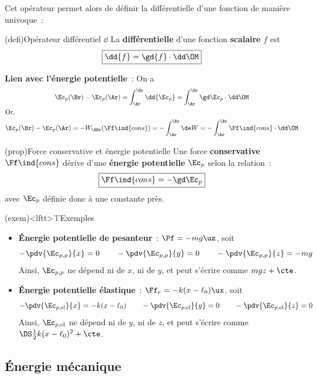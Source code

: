 \documentclass[../../main/main.tex]{subfiles}
\begin{document}
Cet opérateur permet alors de définir la différentielle d'une fonction de
manière univoque~:

\begin{tcb*}(defi){Opérateur différentiel $\dd$}
	La \textbf{différentielle} d'une fonction \textbf{scalaire} $f$ est
	\[\boxed{\dd{f} = \gd{f}\cdot\dd\OM}\]
\end{tcb*}

\textbf{Lien avec l'énergie potentielle}~: On a
\begin{gather*}
	\Ec_p(\Br) - \Ec_p(\Ar) = \int_{\Ar}^{\Br} \dd{\Ec_p} = \int_{\Ar}^{\Br}
	\gd\Ec_p\cdot\dd\OM
	\\
	\shortintertext{Or,}
	\Ec_p(\Br) - \Ec_p(\Ar) = -W_{\ABr}(\Ff\ind{cons}) = - \int_{\Ar}^{\Br} \de W = -
	\int_{\Ar}^{\Br} \Ff\ind{cons}\cdot\dd\OM
\end{gather*}

\begin{tcb*}(prop){Force conservative et énergie potentielle}
	Une force \textbf{conservative} $\Ff\ind{cons}$ dérive d'une \textbf{énergie
		potentielle} $\Ec_p$ selon la relation~:
	\[\boxed{\Ff\ind{cons} = -\gd\Ec_p}\]
	avec $\Ec_p$ définie donc à une constante près.
\end{tcb*}

\begin{tcb*}(exem)<lftt>'l'{Exemples}
	\begin{itemize}
		\item \textbf{Énergie potentielle de pesanteur}~: $\Pf = -mg\uz$, soit
		      \[
			      -\pdv{\Ec_{p,p}}{x} = 0
			      \qquad
			      -\pdv{\Ec_{p,p}}{y} = 0
			      \qquad
			      -\pdv{\Ec_{p,p}}{z} = -mg
		      \]
		      Ainsi, $\Ec_{p,p}$ ne dépend ni de $x$, ni de $y$, et peut s'écrire
		      comme $mgz + \cte$.
		\item \textbf{Énergie potentielle élastique}~: $\Ff_r =
			      -k(x-\ell_0)\ux$, soit
		      \[
			      -\pdv{\Ec_{p,\rm el}}{x} = -k(x-\ell_0)
			      \qquad
			      -\pdv{\Ec_{p,\rm el}}{y} = 0
			      \qquad
			      -\pdv{\Ec_{p,\rm el}}{z} = 0
		      \]
		      Ainsi, $\Ec_{p,\rm el}$ ne dépend ni de $y$, ni de $z$, et peut s'écrire
		      comme $\DS \frac{1}{2}k(x-\ell_0)^2 + \cte$.
	\end{itemize}
\end{tcb*}

\subsection{Énergie mécanique}
\end{document}
